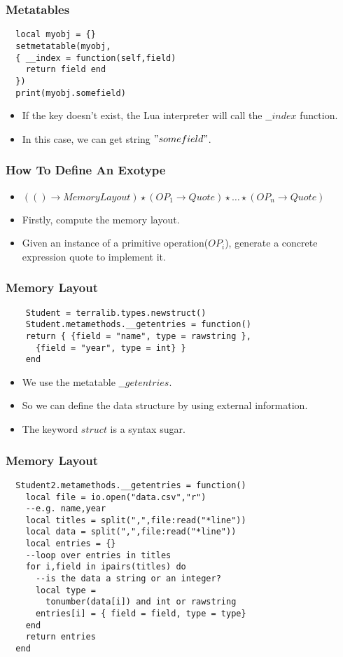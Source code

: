 \documentclass{beamer}
\begin{document}
\begin{frame}[fragile]
	\frametitle{Metatables}
  \begin{lstlisting}
  local myobj = {}
  setmetatable(myobj,
  { __index = function(self,field)
    return field end
  })
  print(myobj.somefield)
  \end{lstlisting} \pause

  \begin{itemize}
  \item If the key doesn't exist, the Lua interpreter will call the $\_\_index$ function.\pause
  \item In this case, we can get string $"somefield"$.
  \end{itemize}
\end{frame}

\begin{frame}
	\frametitle{How To Define An Exotype}
  \begin{itemize}
  \item $(() \rightarrow MemoryLayout) \star (OP_1 \rightarrow Quote) \star \dots \star (OP_n \rightarrow Quote)$\pause
  \item Firstly, compute the memory layout.\pause
  \item Given an instance of a primitive operation($OP_i$), generate a concrete expression quote to implement it.
  \end{itemize}
\end{frame}

\begin{frame}[fragile]
	\frametitle{Memory Layout}
  \begin{lstlisting}
    Student = terralib.types.newstruct()
    Student.metamethods.__getentries = function()
    return { {field = "name", type = rawstring },
      {field = "year", type = int} }
    end
  \end{lstlisting}\pause
  \begin{itemize}
  \item We use the metatable $\_\_getentries$.\pause
  \item So we can define the data structure by using external information.\pause
  \item The keyword $struct$ is a syntax sugar.
  \end{itemize}
\end{frame}

\begin{frame}[fragile]
	\frametitle{Memory Layout}
  \begin{lstlisting}
  Student2.metamethods.__getentries = function()
    local file = io.open("data.csv","r")
    --e.g. name,year
    local titles = split(",",file:read("*line"))
    local data = split(",",file:read("*line"))
    local entries = {}
    --loop over entries in titles
    for i,field in ipairs(titles) do
      --is the data a string or an integer?
      local type =
        tonumber(data[i]) and int or rawstring
      entries[i] = { field = field, type = type}
    end
    return entries
  end
  \end{lstlisting}
\end{frame}
\end{document}
